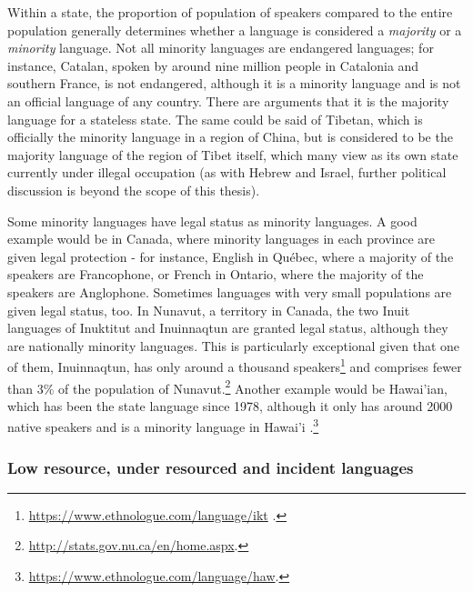 Within a state, the proportion of population of speakers compared to the entire population generally determines whether a language is considered a \textit{majority} or a \textit{minority} language. Not all minority languages are endangered languages; for instance, Catalan, spoken by around nine million people in Catalonia and southern France, is not endangered, although it is a minority language and is not an official language of any country. There are arguments that it is the majority language for a stateless state. The same could be said of Tibetan, which is officially the minority language in a region of China, but is considered to be the majority language of the region of Tibet itself, which many view as its own state currently under illegal occupation (as with Hebrew and Israel, further political discussion is beyond the scope of this thesis).

Some minority languages have legal status as minority languages. A good example would be in Canada, where minority languages in each province are given legal protection - for instance, English in Qu\'ebec, where a majority of the speakers are Francophone, or French in Ontario, where the majority of the speakers are Anglophone. Sometimes languages with very small populations are given legal status, too. In Nunavut, a territory in Canada, the two Inuit languages of Inuktitut and Inuinnaqtun are granted legal status, although they are nationally minority languages. This is particularly exceptional given that one of them, Inuinnaqtun, has only around a thousand speakers\footnote{\href{https://www.ethnologue.com/language/ikt}{https://www.ethnologue.com/language/ikt} \citep{lewis2009ethnologue}. } and comprises fewer than 3\% of the population of Nunavut.\footnote{\href{http://stats.gov.nu.ca/en/home.aspx}{http://stats.gov.nu.ca/en/home.aspx}. } Another example would be Hawai'ian, which has been the state language since 1978, although it only has around 2000 native speakers and is a minority language in Hawai'i \citep{lewis2009ethnologue}.\footnote{\href{https://www.ethnologue.com/language/haw}{https://www.ethnologue.com/language/haw}. }


\subsubsection{Low resource, under resourced and incident languages}

